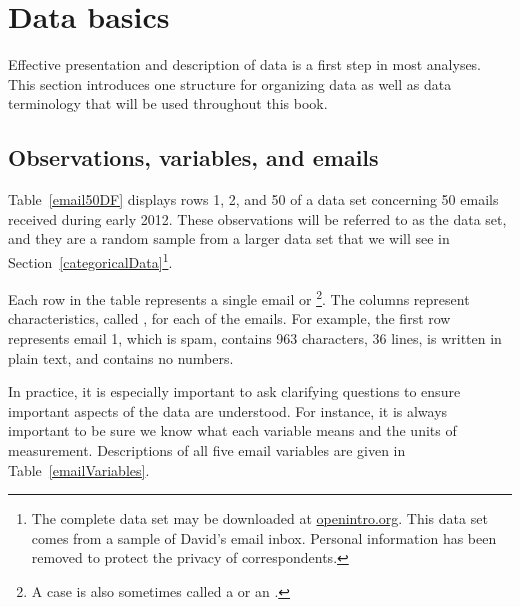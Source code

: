 
\section{Data basics}
\label{dataBasics}

Effective presentation and description of data is a first step in most analyses. This section introduces one structure for organizing data as well as data terminology that will be used throughout this book.

\subsection{Observations, variables, and emails}


Table~\ref{email50DF} displays rows 1, 2, and 50 of a data set concerning 50 emails received during early 2012. These observations will be referred to as the  data set, and they are a random sample from a larger data set that we will see in Section~\ref{categoricalData}\footnote{The complete data set may be downloaded at \href{http://www.openintro.org/downloads.php}{openintro.org}. This data set comes from a sample of David's email inbox. Personal information has been removed to protect the privacy of correspondents.}.

Each row in the table represents a single email or \footnote{A case is also sometimes called a  or an .}. The columns represent characteristics, called , for each of the emails. For example, the first row represents email 1, which is spam, contains 963 characters, 36 lines, is written in plain text, and contains no numbers.


In practice, it is especially important to ask clarifying questions to ensure important aspects of the data are understood. For instance, it is always important to be sure we know what each variable means and the units of measurement. Descriptions of all five email variables are given in Table~\ref{emailVariables}. %


